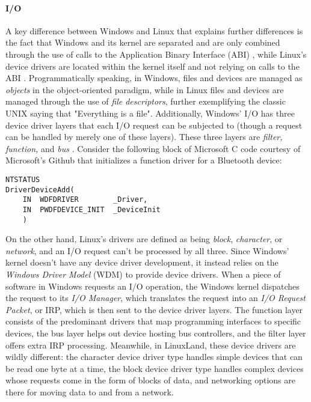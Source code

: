 \documentclass[letterpaper,10pt,titlepage]{article}
\begin{document}
\paragraph{I/O}
A key difference between Windows and Linux that explains further differences is the fact that Windows and its kernel are separated and are only combined through the use of calls to the Application Binary Interface (ABI) \cite{windows3}, while Linux's device drivers are located within the kernel itself and not relying on calls to the ABI \cite{linux1}. Programmatically speaking, in Windows, files and devices are managed as \emph{objects} in the object-oriented paradigm, while in Linux files and devices are managed through the use of \emph{file descriptors}, further exemplifying the classic UNIX saying that "Everything is a file". Additionally, Windows' I/O has three device driver layers that each I/O request can be subjected to (though a request can be handled by merely one of these layers). These three layers are \emph{filter, function,} and \emph{bus} \cite{windows2}. Consider the following block of Microsoft C code courtesy of Microsoft's Github that initializes a function driver for a Bluetooth device:
\begin{lstlisting}
NTSTATUS
DriverDeviceAdd(
    IN  WDFDRIVER        _Driver,
    IN  PWDFDEVICE_INIT  _DeviceInit
    )
\end{lstlisting}
On the other hand, Linux's drivers are defined as being \emph{block}, \emph{character}, or \emph{network}, and an I/O request can't be processed by all three. Since Windows' kernel doesn't have any device driver development, it instead relies on the \emph{Windows Driver Model} (WDM) to provide device drivers. When a piece of software in Windows requests an I/O operation, the Windows kernel dispatches the request to its \emph{I/O Manager}, which translates the request into an \emph{I/O Request Packet}, or IRP, which is then sent to the device driver layers. The function layer consists of the predominant drivers that map programming interfaces to specific devices, the bus layer helps out device hosting bus controllers, and the filter layer offers extra IRP processing. Meanwhile, in LinuxLand, these device drivers are wildly different: the character device driver type handles simple devices that can be read one byte at a time, the block device driver type handles complex devices whose requests come in the form of blocks of data, and networking options are there for moving data to and from a network.         
\end{document}
